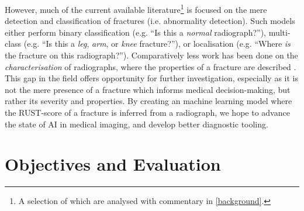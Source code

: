 However, much of the current available literature\footnote{A selection of which are analysed with commentary in \autoref{background}.} is focused on the mere detection and classification of fractures (i.e. abnormality detection). Such models either perform binary classification (e.g. \enquote{Is this a \emph{normal} radiograph?}), multi-class (e.g. \enquote{Is this a \emph{leg}, \emph{arm}, or \emph{knee} fracture?}), or localisation (e.g. \enquote{Where \emph{is} the fracture on this radiograph?}). Comparatively less work has been done on the \emph{characterisation} of radiographs, where the properties of a fracture are described \autocite{Tanzi2020}. This gap in the field offers opportunity for further investigation, especially as it is not the mere presence of a fracture which informs medical decision-making, but rather its severity and properties. By creating an machine learning model where the RUST-score of a fracture is inferred from a radiograph, we hope to advance the state of AI in medical imaging, and develop better diagnostic tooling.

\section{Objectives and Evaluation}




